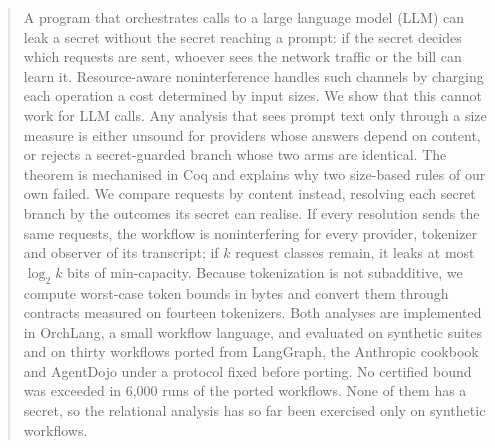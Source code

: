 \begin{abstract}
A program that orchestrates calls to a large language model (LLM) can leak a
secret without the secret reaching a prompt: if the secret decides which
requests are sent, whoever sees the network traffic or the bill can learn it.
Resource-aware noninterference handles such channels by charging each operation
a cost determined by input sizes. We show that this cannot work for LLM calls. Any analysis that sees prompt text only through a size measure is
either unsound for providers whose answers depend on content, or rejects a
secret-guarded branch whose two arms are identical. The theorem is mechanised in
Coq and explains why two size-based rules of our own failed. We compare
requests by content instead, resolving each secret branch by the outcomes its
secret can realise. If every resolution sends the same requests, the workflow is
noninterfering for every provider, tokenizer and observer of its transcript; if
$k$ request classes remain, it leaks at most $\log_2 k$ bits of min-capacity.
Because tokenization is not subadditive, we compute worst-case token bounds in
bytes and convert them through contracts measured on fourteen tokenizers. Both
analyses are implemented in OrchLang, a small workflow language, and evaluated on
synthetic suites and on thirty workflows ported from
LangGraph, the Anthropic cookbook and AgentDojo under a protocol fixed before
porting. No certified bound was exceeded in 6,000 runs of the ported workflows.
None of them has a secret, so the relational analysis has so far been exercised
only on synthetic workflows.
\end{abstract}
